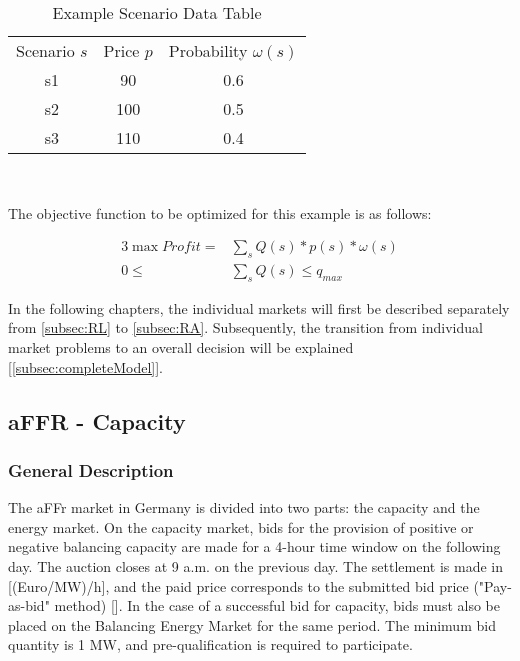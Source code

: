 \begin{table}[H]
	\begin{tabular}{c|c|c}
		\hline
		Scenario $s$ & Price $p$ & Probability $\omega(s)$ \\
		s1           & 90        & 0.6                     \\
		s2           & 100       & 0.5                     \\
		s3           & 110       & 0.4                     \\
	\end{tabular}\\
	\caption{Example Scenario Data Table}
	\label{tab:example_scenario}
\end{table}

The objective function to be optimized for this example is as follows:

\begin{alignat}{3}
	\max Profit = & \sum_{s} Q(s) * p(s) * \omega(s) \\
	0 \leq        & \sum_{s} Q(s) \leq q_{max}
\end{alignat}

In the following chapters, the individual markets will first be described separately from \autoref{subsec:RL} to \autoref{subsec:RA}.
Subsequently, the transition from individual market problems to an overall decision will be explained [\autoref{subsec:completeModel}].

\subsection{aFFR - Capacity}
\label{subsec:RL}
\subsubsection{General Description}
The aFFr market in Germany is divided into two parts: the capacity and the energy market.
On the capacity market, bids for the provision of positive or negative balancing capacity are made for a 4-hour time window on the following day.
The auction closes at 9 a.m. on the previous day.
The settlement is made in [(Euro/MW)/h], and the paid price corresponds to the submitted bid price ("Pay-as-bid" method) [\cite{.04.12.2024}].
In the case of a successful bid for capacity, bids must also be placed on the Balancing Energy Market for the same period.
The minimum bid quantity is 1 MW, and pre-qualification is required to participate.

